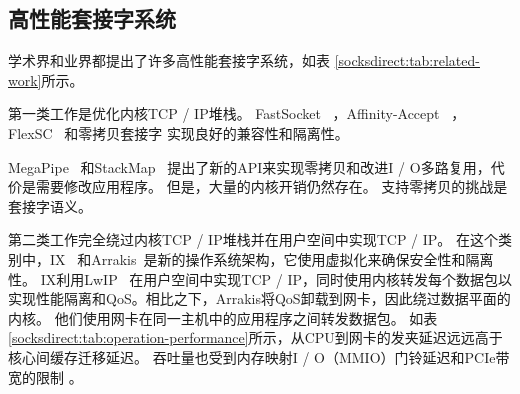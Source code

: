 




\subsection{高性能套接字系统}
\label{socksdirect:subsec:related-work}

学术界和业界都提出了许多高性能套接字系统，如表 \ref {socksdirect:tab:related-work}所示。

第一类工作是优化内核TCP / IP堆栈。 FastSocket~ \cite {lin2016scalable}，Affinity-Accept~ \cite {pesterev2012improving}，FlexSC~ \cite {soares2010flexsc}和零拷贝套接字 \cite {thadani1995efficient,chu1996zero,linux-zero-copy}实现良好的兼容性和隔离性。

MegaPipe~ \cite {han2012megapipe}和StackMap~ \cite {yasukata2016stackmap}提出了新的API来实现零拷贝和改进I / O多路复用，代价是需要修改应用程序。
但是，大量的内核开销仍然存在。
支持零拷贝的挑战是套接字语义。

第二类工作完全绕过内核TCP / IP堆栈并在用户空间中实现TCP / IP。
在这个类别中，IX~ \cite {belay2017ix}和Arrakis~\cite {peter2016arrakis}是新的操作系统架构，它使用虚拟化来确保安全性和隔离性。 IX利用LwIP~ \cite {dunkels2001design}在用户空间中实现TCP / IP，同时使用内核转发每个数据包以实现性能隔离和QoS。相比之下，Arrakis将QoS卸载到网卡，因此绕过数据平面的内核。
他们使用网卡在同一主机中的应用程序之间转发数据包。
如表 \ref {socksdirect:tab:operation-performance}所示，从CPU到网卡的发夹延迟远远高于核心间缓存迁移延迟。
吞吐量也受到内存映射I / O（MMIO）门铃延迟和PCIe带宽的限制 \cite {neugebauer2018understanding,li2017kv}。

